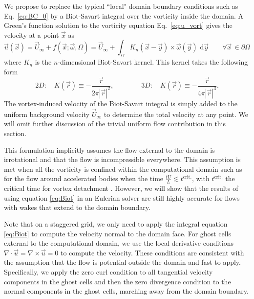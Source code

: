 \documentclass[final,1p,times]{elsarticle}
\begin{document}
We propose to replace the typical ``local" domain boundary conditions such as Eq.~\ref{eq:BC_0} by a Biot-Savart integral over the vorticity inside the domain. A Green's function solution to the vorticity equation Eq.~\ref{eq:u_vort} gives the velocity at a point $\vec x$ as
\begin{equation}\label{eq:Biot}
    {\vec u}({\vec x}) = \vec U_\infty+f(\vec x; \vec\omega,\Omega) = \vec U_\infty+\int_\Omega K_{n}({\vec x} - \vec{y})\times \vec\omega({\vec y})\text{ d}\vec{y} \quad\quad \forall \vec x\, \in \partial\Omega
\end{equation}
where $K_n$ is the $n$-dimensional Biot-Savart kernel. This kernel takes the following form \cite{Eldredge2019MathematicalFlows}
\begin{equation}\label{eq:kernels}
    2D:\quad K(\vec r)\equiv -\frac{\vec{r}}{2\pi|\vec{r}|^2}, \qquad\qquad 3D:\quad K(\vec r)\equiv -\frac{\vec{r}}{4\pi|\vec{r}|^3}.
\end{equation}
The vortex-induced velocity of the Biot-Savart integral is simply added to the uniform background velocity $\vec U_\infty$ to determine the total velocity at any point. We will omit further discussion of the trivial uniform flow contribution in this section.

This formulation implicitly assumes the flow external to the domain is irrotational and that the flow is incompressible everywhere. This assumption is met when all the vorticity is confined within the computational domain such as for the flow around accelerated bodies when the time $\frac{tU}{L}\lesssim t^{\text{crit.}}$, with $t^{\text{crit.}}$ the critical time for vortex detachment \cite{Shusser2000EnergyRing}. However, we will show that the results of using equation \ref{eq:Biot} in an Eulerian solver are still highly accurate for flows with wakes that extend to the domain boundary. 

Note that on a staggered grid, we only need to apply the integral equation \ref{eq:Biot} to compute the velocity normal to the domain face. For ghost cells external to the computational domain, we use the local derivative conditions $\nabla\cdot\vec{u} = \nabla\times\vec{u}=0$ to compute the velocity. These conditions are consistent with the assumption that the flow is potential outside the domain and fast to apply. Specifically, we apply the zero curl condition to all tangential velocity components in the ghost cells and then the zero divergence condition to the normal components in the ghost cells, marching away from the domain boundary.
\end{document}

